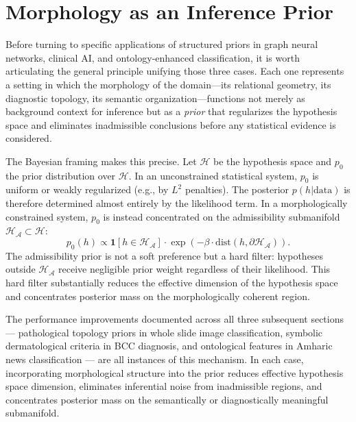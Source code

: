 \documentclass[11pt, oneside]{article}
\numberwithin{equation}{section}
\theoremstyle{rsvpstyle}
\theoremstyle{remark}
\newcommand{\Adm}{\mathcal{A}}
\begin{document}
\section{Morphology as an Inference Prior}
\label{sec:morphprior}

Before turning to specific applications of structured priors in graph neural networks,
clinical AI, and ontology-enhanced classification, it is worth articulating the
general principle unifying those three cases. Each one represents a setting in which
the morphology of the domain---its relational geometry, its diagnostic topology, its
semantic organization---functions not merely as background context for inference but
as a \emph{prior} that regularizes the hypothesis space and eliminates inadmissible
conclusions before any statistical evidence is considered.

The Bayesian framing makes this precise. Let $\mathcal{H}$ be the hypothesis space
and $p_0$ the prior distribution over $\mathcal{H}$. In an unconstrained statistical
system, $p_0$ is uniform or weakly regularized (e.g., by $L^2$ penalties). The
posterior $p(h | \text{data})$ is therefore determined almost entirely by the
likelihood term. In a morphologically constrained system, $p_0$ is instead concentrated
on the admissibility submanifold $\mathcal{H}_\Adm \subset \mathcal{H}$:
\begin{equation}
  p_0(h) \propto \mathbf{1}[h \in \mathcal{H}_\Adm] \cdot \exp(-\beta \cdot
  \text{dist}(h, \partial \mathcal{H}_\Adm)).
\end{equation}
The admissibility prior is not a soft preference but a hard filter: hypotheses
outside $\mathcal{H}_\Adm$ receive negligible prior weight regardless of their
likelihood. This hard filter substantially reduces the effective dimension of the
hypothesis space and concentrates posterior mass on the morphologically coherent region.

The performance improvements documented across all three subsequent sections ---
pathological topology priors in whole slide image classification, symbolic dermatological
criteria in BCC diagnosis, and ontological features in Amharic news classification ---
are all instances of this mechanism. In each case, incorporating morphological structure
into the prior reduces effective hypothesis space dimension, eliminates inferential
noise from inadmissible regions, and concentrates posterior mass on the semantically
or diagnostically meaningful submanifold.
\end{document}

